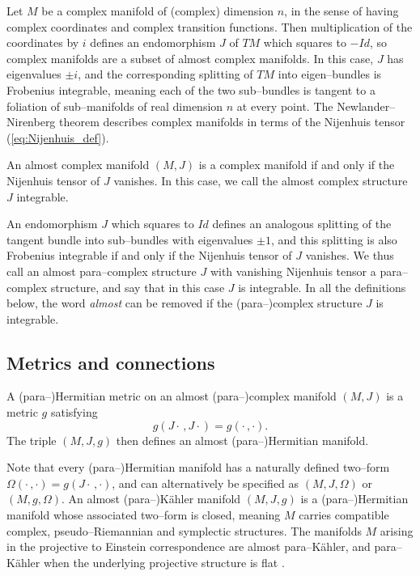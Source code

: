 Let $M$ be a complex manifold of (complex) dimension $n$, in the sense of having complex coordinates and complex transition functions. Then multiplication of the coordinates by $i$ defines an endomorphism $J$ of $TM$ which squares to $-Id$, so complex manifolds are a subset of almost complex manifolds. In this case, $J$ has eigenvalues $\pm i$, and the corresponding splitting of $TM$ into eigen--bundles is Frobenius integrable, meaning each of the two sub--bundles is tangent to a foliation of sub--manifolds of real dimension $n$ at every point. The Newlander--Nirenberg theorem describes complex manifolds in terms of the Nijenhuis tensor (\ref{eq:Nijenhuis_def}).

\begin{theo}[\cite{CG}]
An almost complex manifold $(M,J)$ is a complex manifold if and only if the Nijenhuis tensor of $J$ vanishes. In this case, we call the almost complex structure $J$ integrable.
\end{theo}


An endomorphism $J$ which squares to $Id$ defines an analogous splitting of the tangent bundle into sub--bundles with eigenvalues $\pm 1$, and this splitting is also Frobenius integrable if and only if the Nijenhuis tensor of $J$ vanishes. We thus call an almost para--complex structure $J$ with vanishing Nijenhuis tensor a para--complex structure, and say that in this case $J$ is integrable. In all the definitions below, the word \textit{almost} can be removed if the (para--)complex structure $J$ is integrable.

\subsection{Metrics and connections}

\begin{defi}
A (para--)Hermitian metric on an almost (para--)complex manifold $(M,J)$ is a metric $g$ satisfying
\[
g(J\cdot\,,J\cdot) = g(\cdot\,,\cdot).
\]
The triple $(M,J,g)$ then defines an almost (para--)Hermitian manifold.
\end{defi}

Note that every (para--)Hermitian manifold has a naturally defined two--form $\Omega(\cdot\,,\cdot)=g(J\cdot\,,\cdot)$, and can alternatively be specified as $(M,J,\Omega)$ or $(M,g,\Omega)$. An almost (para--)K\"ahler manifold $(M,J,g)$ is a (para--)Hermitian manifold whose associated two--form is closed, meaning $M$ carries compatible complex, pseudo--Riemannian and symplectic structures. The manifolds $M$ arising in the projective to Einstein correspondence are almost para--K\"ahler, and para--K\"ahler when the underlying projective structure is flat \cite{DM}.

